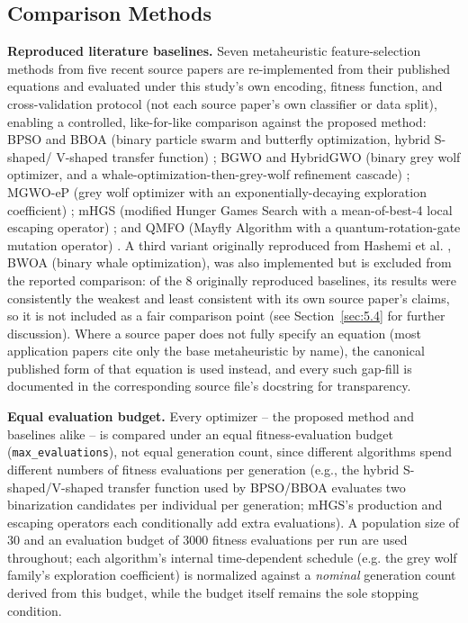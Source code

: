 \subsection{Comparison Methods}
\label{sec:3.7}

\textbf{Reproduced literature baselines.} Seven metaheuristic
feature-selection methods from five recent source papers are
re-implemented from their published equations and evaluated under this
study's own encoding, fitness function, and cross-validation protocol
(not each source paper's own classifier or data split), enabling a
controlled, like-for-like comparison against the proposed method: BPSO and BBOA
(binary particle swarm and butterfly optimization, hybrid S-shaped/
V-shaped transfer function) \cite{Hashemi:2026}; BGWO and HybridGWO
(binary grey wolf optimizer, and a whale-optimization-then-grey-wolf
refinement cascade) \cite{AlNajjar:2024}; MGWO-eP (grey wolf optimizer
with an exponentially-decaying exploration coefficient)
\cite{Santhosh:2025}; mHGS (modified Hunger Games Search with a
mean-of-best-4 local escaping operator) \cite{Hashim:2023}; and QMFO
(Mayfly Algorithm with a quantum-rotation-gate mutation operator)
\cite{Mansour:2024}. A third variant originally reproduced from Hashemi
et al. \cite{Hashemi:2026}, BWOA (binary whale optimization), was also
implemented but is excluded from the reported comparison: of the 8
originally reproduced baselines, its results were consistently the
weakest and least consistent with its own source paper's claims, so it is
not included as a fair comparison point (see Section~\ref{sec:5.4} for
further discussion). Where a source paper does not fully specify an
equation
(most application papers cite only the base metaheuristic by name), the
canonical published form of that equation is used instead, and every such
gap-fill is documented in the corresponding source file's docstring for
transparency.

\textbf{Equal evaluation budget.} Every optimizer -- the proposed method and
baselines alike -- is compared under an equal fitness-evaluation budget
(\texttt{max\_evaluations}), not equal generation count, since different
algorithms spend different numbers of fitness evaluations per generation
(e.g., the hybrid S-shaped/V-shaped transfer function used by
BPSO/BBOA evaluates two binarization candidates per individual per
generation; mHGS's production and escaping operators each conditionally
add extra evaluations). A population size of 30 and an evaluation budget
of 3000 fitness evaluations per run are used throughout; each algorithm's
internal time-dependent schedule (e.g. the grey
wolf family's exploration coefficient) is normalized against a
\emph{nominal} generation count derived from this budget, while the
budget itself remains the sole stopping condition.

